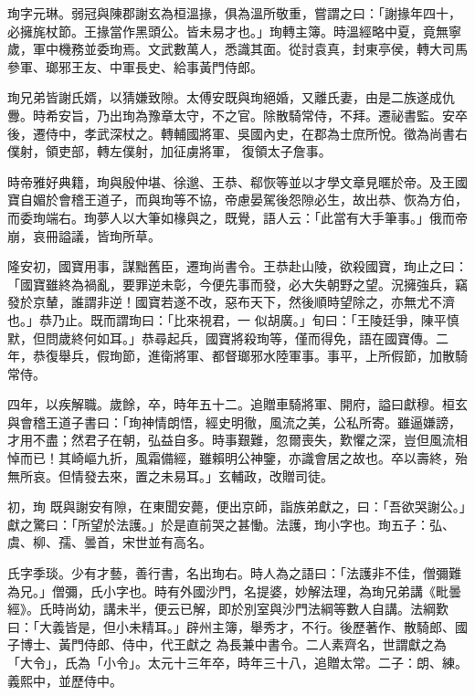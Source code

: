 \begin{pinyinscope}
 珣字元琳。弱冠與陳郡謝玄為桓溫掾，俱為溫所敬重，嘗謂之曰：「謝掾年四十，必擁旄杖節。王掾當作黑頭公。皆未易才也。」珣轉主簿。時溫經略中夏，竟無寧歲，軍中機務並委珣焉。文武數萬人，悉識其面。從討袁真，封東亭侯，轉大司馬參軍、瑯邪王友、中軍長史、給事黃門侍郎。



 珣兄弟皆謝氏婿，以猜嫌致隙。太傅安既與珣絕婚，又離氏妻，由是二族遂成仇釁。時希安旨，乃出珣為豫章太守，不之官。除散騎常侍，不拜。遷祕書監。安卒後，遷侍中，孝武深杖之。轉輔國將軍、吳國內史，在郡為士庶所悅。徵為尚書右僕射，領吏部，轉左僕射，加征虜將軍，
 復領太子詹事。



 時帝雅好典籍，珣與殷仲堪、徐邈、王恭、郗恢等並以才學文章見暱於帝。及王國寶自媚於會稽王道子，而與珣等不協，帝慮晏駕後怨隙必生，故出恭、恢為方伯，而委珣端右。珣夢人以大筆如椽與之，既覺，語人云：「此當有大手筆事。」俄而帝崩，哀冊謚議，皆珣所草。



 隆安初，國寶用事，謀黜舊臣，遷珣尚書令。王恭赴山陵，欲殺國寶，珣止之曰：「國寶雖終為禍亂，要罪逆未彰，今便先事而發，必大失朝野之望。況擁強兵，竊發於京輦，誰謂非逆！國寶若遂不改，惡布天下，然後順時望除之，亦無尤不濟也。」恭乃止。既而謂珣曰：「比來視君，一
 似胡廣。」旬曰：「王陵廷爭，陳平慎默，但問歲終何如耳。」恭尋起兵，國寶將殺珣等，僅而得免，語在國寶傳。二年，恭復舉兵，假珣節，進衛將軍、都督瑯邪水陸軍事。事平，上所假節，加散騎常侍。



 四年，以疾解職。歲餘，卒，時年五十二。追贈車騎將軍、開府，謚曰獻穆。桓玄與會稽王道子書曰：「珣神情朗悟，經史明徹，風流之美，公私所寄。雖逼嫌謗，才用不盡；然君子在朝，弘益自多。時事艱難，忽爾喪失，歎懼之深，豈但風流相悼而已！其崎嶇九折，風霜備經，雖賴明公神鑒，亦識會居之故也。卒以壽終，殆無所哀。但情發去來，置之未易耳。」玄輔政，改贈司徒。



 初，珣
 既與謝安有隙，在東聞安薨，便出京師，詣族弟獻之，曰：「吾欲哭謝公。」獻之驚曰：「所望於法護。」於是直前哭之甚慟。法護，珣小字也。珣五子：弘、虞、柳、孺、曇首，宋世並有高名。



 氏字季琰。少有才藝，善行書，名出珣右。時人為之語曰：「法護非不佳，僧彌難為兄。」僧彌，氏小字也。時有外國沙門，名提婆，妙解法理，為珣兄弟講《毗曇經》。氏時尚幼，講未半，便云已解，即於別室與沙門法綱等數人自講。法綱歎曰：「大義皆是，但小未精耳。」辟州主簿，舉秀才，不行。後歷著作、散騎郎、國子博士、黃門侍郎、侍中，代王獻之
 為長兼中書令。二人素齊名，世謂獻之為「大令」，氏為「小令」。太元十三年卒，時年三十八，追贈太常。二子：朗、練。義熙中，並歷侍中。




\end{pinyinscope}
